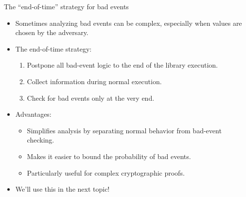 \documentclass[aspectratio=169, lualatex, handout]{beamer}
\begin{document}
\begin{frame}{The ``end-of-time'' strategy for bad events}
	\begin{itemize}
		\item Sometimes analyzing bad events can be complex, especially when values are chosen by the adversary.
		\item The end-of-time strategy:
		      \begin{enumerate}
			      \item Postpone all bad-event logic to the end of the library execution.
			      \item Collect information during normal execution.
			      \item Check for bad events only at the very end.
		      \end{enumerate}
		\item Advantages:
		      \begin{itemize}
			      \item Simplifies analysis by separating normal behavior from bad-event checking.
			      \item Makes it easier to bound the probability of bad events.
			      \item Particularly useful for complex cryptographic proofs.
		      \end{itemize}
		\item We'll use this in the next topic!
	\end{itemize}
\end{frame}

\begin{frame}[plain]
	\titlepage
\end{frame}
\end{document}
